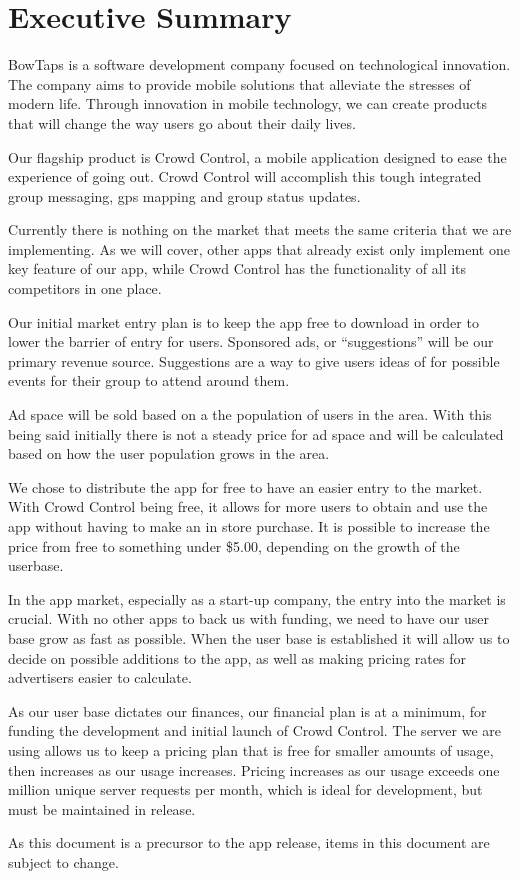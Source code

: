 

\chapter{Executive Summary}


BowTaps is a software development company focused on technological innovation. The company aims to provide mobile solutions that alleviate the stresses of modern life. Through innovation in mobile technology, we can create products that will change the way users go about their daily lives.

 Our flagship product is Crowd Control, a mobile application designed to ease the experience of going out. Crowd Control will accomplish this tough integrated group messaging, gps mapping and group status updates.
 
Currently there is nothing on the market that meets the same criteria that we are implementing. As we will cover, other apps that already exist only implement one key feature of our app, while Crowd Control has the functionality of all its competitors in one place.
 
Our initial market entry plan is to keep the app free to download in order to lower the barrier of entry for users. Sponsored ads, or “suggestions” will be our primary revenue source. Suggestions are a way to give users ideas of for possible events for their group to attend around them.

Ad space will be sold based on a the population of users in the area. With this being said initially there is not a steady price for ad space and will be calculated based on how the user population grows in the area.

We chose to distribute the app for free to have an easier entry to the market. With Crowd Control being free, it allows for more users to obtain and use the app without having to make an in store purchase. It is possible to increase the price from free to something under \$5.00, depending on the growth of the userbase.

In the app market, especially as a start-up company, the entry into the market is crucial. With no other apps to back us with funding, we need to have our user base grow as fast as possible. When the user base is established it will allow us to decide on possible additions to the app, as well as making pricing rates for advertisers easier to calculate. 

As our user base dictates our finances, our financial plan is at a minimum, for funding the development and initial launch of Crowd Control. The server we are using allows us to keep a pricing plan that is free for smaller amounts of usage, then increases as our usage increases. Pricing increases as our usage exceeds one million unique server requests per month, which is ideal for development, but must be maintained in release.

As this document is a precursor to the app release, items in this document are subject to change.




